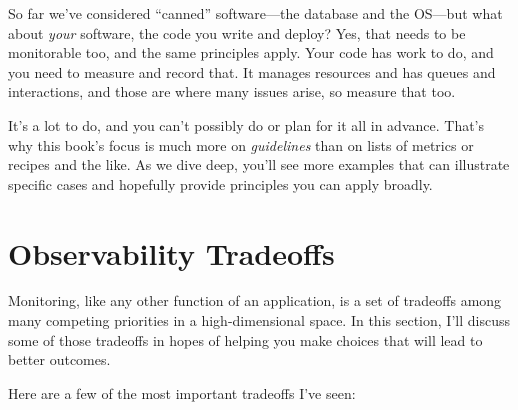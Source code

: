\documentclass{vivid_layout}
\begin{document}
So far we've considered ``canned'' software---the database and the OS---but what
about \emph{your} software, the code you write and deploy? Yes, that needs to be
monitorable too, and the same principles apply. Your code has work to do, and
you need to measure and record that. It manages resources and has queues and
interactions, and those are where many issues arise, so measure that too.

It's a lot to do, and you can't possibly do or plan for it all in advance.
That's why this book's focus is much more on \emph{guidelines} than on 
lists of metrics or recipes and the like. As we dive deep, you'll see
more examples that can illustrate specific cases and hopefully provide
principles you can apply broadly.

\section{Observability Tradeoffs}

Monitoring, like any other function of an application, is a set of
tradeoffs among many competing priorities in a high-dimensional space. In this
section, I'll discuss some of those tradeoffs in hopes of helping you make
choices that will lead to better outcomes.

Here are a few of the most important tradeoffs I've seen:
\end{document}
